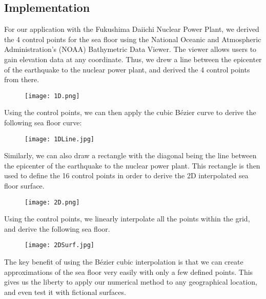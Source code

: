 \documentclass[../main.tex]{subfiles}
\begin{document}
\subsection{Implementation}
For our application with the Fukushima Daiichi Nuclear Power Plant, we derived the 4 control points for the sea floor using the National Oceanic and Atmospheric Administration's (NOAA) Bathymetric Data Viewer.  The viewer allows users to gain elevation data at any coordinate.  Thus, we drew a line between the epicenter of the earthquake to the nuclear power plant, and derived the 4 control points from there.
\begin{figure}[H]
\centering
\texttt{[image: 1D.png]}
\end{figure}
\noindent Using the control points, we can then apply the cubic B\'ezier curve to derive the following sea floor curve:
\begin{figure}[H]
\centering
\texttt{[image: 1DLine.jpg]}
\end{figure}
\noindent Similarly, we can also draw a rectangle with the diagonal being the line between the epicenter of the earthquake to the nuclear power plant.  This rectangle is then used to define the 16 control points in order to derive the 2D interpolated sea floor surface.
\begin{figure}[H]
\centering
\texttt{[image: 2D.png]}
\end{figure}
\noindent Using the control points, we linearly interpolate all the points within the grid, and derive the following sea floor.
\begin{figure}[H]
\centering
\texttt{[image: 2DSurf.jpg]}
\end{figure}

\noindent The key benefit of using the B\'ezier cubic interpolation is that we can create approximations of the sea floor very easily with only a few defined points.  This gives us the liberty to apply our numerical method to any geographical location, and even test it with fictional surfaces.
\end{document}
